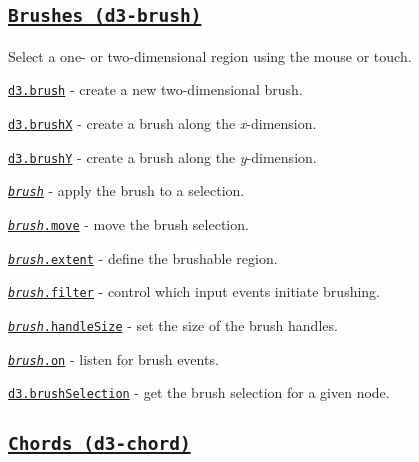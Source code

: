 \subsection*{\href{https://github.com/d3/d3-brush}{\tt Brushes (d3-\/brush)}}

Select a one-\/ or two-\/dimensional region using the mouse or touch.


\begin{DoxyItemize}
\item \href{https://github.com/d3/d3-brush/blob/master/README.md#brush}{\tt d3.\+brush} -\/ create a new two-\/dimensional brush.
\item \href{https://github.com/d3/d3-brush/blob/master/README.md#brushX}{\tt d3.\+brushX} -\/ create a brush along the {\itshape x}-\/dimension.
\item \href{https://github.com/d3/d3-brush/blob/master/README.md#brushY}{\tt d3.\+brushY} -\/ create a brush along the {\itshape y}-\/dimension.
\item \href{https://github.com/d3/d3-brush/blob/master/README.md#_brush}{\tt {\itshape brush}} -\/ apply the brush to a selection.
\item \href{https://github.com/d3/d3-brush/blob/master/README.md#brush_move}{\tt {\itshape brush}.move} -\/ move the brush selection.
\item \href{https://github.com/d3/d3-brush/blob/master/README.md#brush_extent}{\tt {\itshape brush}.extent} -\/ define the brushable region.
\item \href{https://github.com/d3/d3-brush/blob/master/README.md#brush_filter}{\tt {\itshape brush}.filter} -\/ control which input events initiate brushing.
\item \href{https://github.com/d3/d3-brush/blob/master/README.md#brush_handleSize}{\tt {\itshape brush}.handle\+Size} -\/ set the size of the brush handles.
\item \href{https://github.com/d3/d3-brush/blob/master/README.md#brush_on}{\tt {\itshape brush}.on} -\/ listen for brush events.
\item \href{https://github.com/d3/d3-brush/blob/master/README.md#brushSelection}{\tt d3.\+brush\+Selection} -\/ get the brush selection for a given node.
\end{DoxyItemize}

\subsection*{\href{https://github.com/d3/d3-chord}{\tt Chords (d3-\/chord)}}


